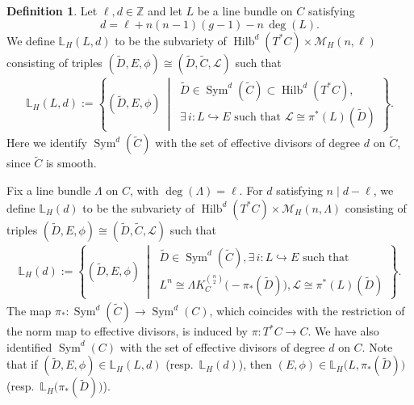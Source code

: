 \documentclass[twoside, 11pt]{article}
\numberwithin{equation}{section}
\theoremstyle{theorem}
\numberwithin{theorem}{section}
\theoremstyle{definition}
\newtheorem{definition}[definition]{Definition}
\begin{document}
\begin{definition}\label{def:lag on extended space}
Let $\ell,d \in \mathbb{Z}$ and let $L$ be a line bundle on $C$ satisfying
$$
d = \ell + n(n-1)(g-1) - n\,\deg(L).
$$
We define $\mathbb{L}_H(L,d)$ to be the subvariety of
\(
\operatorname{Hilb}^d(T^\ast C)\times \mathcal{M}_{H}(n, \ell)
\)
consisting of triples $(\widetilde{D},E,\phi)\cong (\widetilde{D},\widetilde{C},\mathcal{L})$ such that
\begin{align}
\mathbb{L}_H(L,d)
:=
\left\{
    (\widetilde{D}, E, \phi)\ \middle|\ 
    \begin{array}{l}
        \widetilde{D}\in \operatorname{Sym}^d(\widetilde{C}) \subset \operatorname{Hilb}^d(T^\ast C),  \\[2pt]
        \exists\, i: L \hookrightarrow E \text{ such that }\mathcal{L} \cong \pi^\ast(L)(\widetilde{D})
    \end{array}
\right\}.
\end{align}
Here we identify $\operatorname{Sym}^d(\widetilde{C})$ with the set of effective divisors of degree $d$ on $\widetilde{C}$, since $\widetilde{C}$ is smooth.


Fix a line bundle $\Lambda$ on $C$, with $\deg(\Lambda)=\ell$. For $d$ satisfying $n \mid d-\ell$, we define $\mathbb{L}_H(d)$ to be the subvariety of
\(
\operatorname{Hilb}^d(T^\ast C)\times \mathcal{M}_H(n,\Lambda)
\)
consisting of triples $(\widetilde{D},E,\phi) \cong (\widetilde{D},\widetilde{C},\mathcal{L}) $ such that
\begin{align}
\mathbb{L}_H(d)
:=
\left\{
    (\widetilde{D}, E, \phi)\ \middle|\ 
    \begin{array}{l}
        \widetilde{D}\in \operatorname{Sym}^d(\widetilde{C}), \exists\, i:L \hookrightarrow E \text{ such that } \\[2pt]
        L^{n} \cong \Lambda K_C^{\binom{n}{2}}\bigl(-\pi_\ast(\widetilde{D})\bigr),  
        \mathcal{L} \cong \pi^\ast(L)(\widetilde{D})
    \end{array}
\right\}.
\end{align}
The map $\pi_\ast:\operatorname{Sym}^d(\widetilde C)\to \operatorname{Sym}^d(C)$, which coincides with the restriction of the norm map to effective divisors, is induced by $\pi:T^\ast C\to C$.
We have also identified $\operatorname{Sym}^d(C)$ with the set of effective divisors of degree $d$ on $C$.
\medskip
Note that if $(\widetilde{D},E,\phi)\in \mathbb{L}_H(L,d)$ (resp.\ $\mathbb{L}_H(d)$), then $(E,\phi)\in \mathbb{L}_H\!\bigl(L,\pi_\ast(\widetilde{D})\bigr)$ (resp.\ $\mathbb{L}_H\!\bigl(\pi_\ast(\widetilde{D})\bigr)$).
\end{definition}
\end{document}
